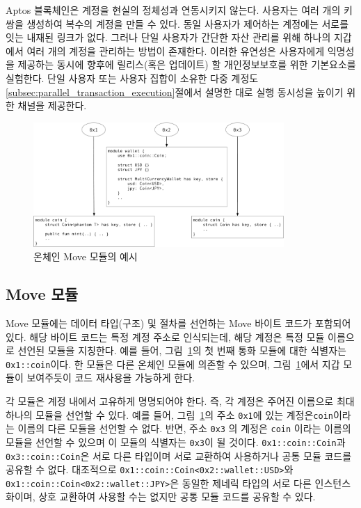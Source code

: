 \documentclass{article}
\begin{document}
Aptos 블록체인은 계정을 현실의 정체성과 연동시키지 않는다. 사용자는 여러 개의 키 쌍을 생성하여 복수의 계정을 만들 수 있다. 동일 사용자가 제어하는 계정에는 서로를 잇는 내재된 링크가 없다. 그러나 단일 사용자가 간단한 자산 관리를 위해 하나의 지갑에서 여러 개의 계정을 관리하는 방법이 존재한다. 이러한 유연성은 사용자에게 익명성을 제공하는 동시에 향후에 릴리스(혹은 업데이트) 할 개인정보보호를 위한 기본요소를 실험한다. 단일 사용자 또는 사용자 집합이 소유한 다중 계정도 \ref{subsec:parallel_transaction_execution}절에서 설명한 대로 실행 동시성을 높이기 위한 채널을 제공한다.

\begin{figure}
\centering
\includegraphics[width=0.85\textwidth]{move_1.pdf}
\caption{\label{fig:move_modules}온체인 Move 모듈의 예시}
\end{figure}

\subsection{Move 모듈}
\label{sec:move_modules}

Move 모듈에는 데이터 타입(구조) 및 절차를 선언하는 Move 바이트 코드가 포함되어 있다. 해당 바이트 코드는 특정 계정 주소로 인식되는데, 해당 계정은 특정 모듈 이름으로 선언된 모듈을 지칭한다. 예를 들어, 그림~\ref{fig:move_modules}의 첫 번째 통화 모듈에 대한 식별자는 \texttt{0x1::coin}이다. 한 모듈은 다른 온체인 모듈에 의존할 수 있으며, 그림~\ref{fig:move_modules}에서 지갑 모듈이 보여주듯이 코드 재사용을 가능하게 한다.

각 모듈은 계정 내에서 고유하게 명명되어야 한다. 즉, 각 계정은 주어진 이름으로 최대 하나의 모듈을 선언할 수 있다. 예를 들어, 그림~\ref{fig:move_modules}의 주소 \texttt{0x1}에 있는 계정은\texttt{coin}이라는 이름의 다른 모듈을 선언할 수 없다. 반면, 주소 \texttt{0x3} 의 계정은 \texttt{coin} 이라는 이름의 모듈을 선언할 수 있으며 이 모듈의 식별자는  \texttt{0x3}이 될 것이다. \texttt{0x1::coin::Coin}과 \texttt{0x3::coin::Coin}은 서로 다른 타입이며 서로 교환하여 사용하거나 공통 모듈 코드를 공유할 수 없다. 대조적으로  \texttt{0x1::coin::Coin<0x2::wallet::USD>}와 \texttt{0x1::coin::Coin<0x2::wallet::JPY>}은 동일한 제네릭 타입의 서로 다른 인스턴스화이며, 상호 교환하여 사용할 수는 없지만 공통 모듈 코드를 공유할 수 있다.
\end{document}
